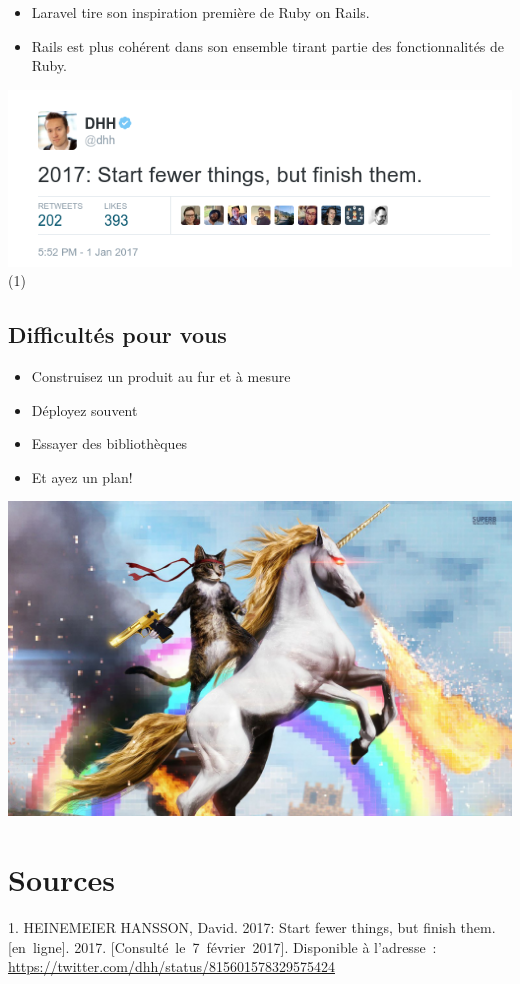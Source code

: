 \begin{itemize}
\tightlist
\item
  Laravel tire son inspiration première de Ruby on Rails.
\item
  Rails est plus cohérent dans son ensemble tirant partie des
  fonctionnalités de Ruby.
\end{itemize}

\includegraphics{src/img/dhh.png}(1)

\hypertarget{difficultuxe9s-pour-vous}{%
\subsection{Difficultés pour vous}\label{difficultuxe9s-pour-vous}}

\begin{itemize}
\tightlist
\item
  Construisez un produit au fur et à mesure
\item
  Déployez souvent
\item
  Essayer des bibliothèques
\item
  Et ayez un plan!
\end{itemize}

\includegraphics{src/img/rainbow.jpg}

\hypertarget{sources}{%
\section*{Sources}\label{sources}}

\hypertarget{refs}{}
\begin{cslreferences}
\leavevmode\hypertarget{ref-dhh:2017}{}%
1. HEINEMEIER HANSSON, David. 2017: Start fewer things, but finish them.
{[}en~ligne{]}. 2017. {[}Consulté~le~7~février~2017{]}. Disponible à
l'adresse~: \url{https://twitter.com/dhh/status/815601578329575424}
\end{cslreferences}
